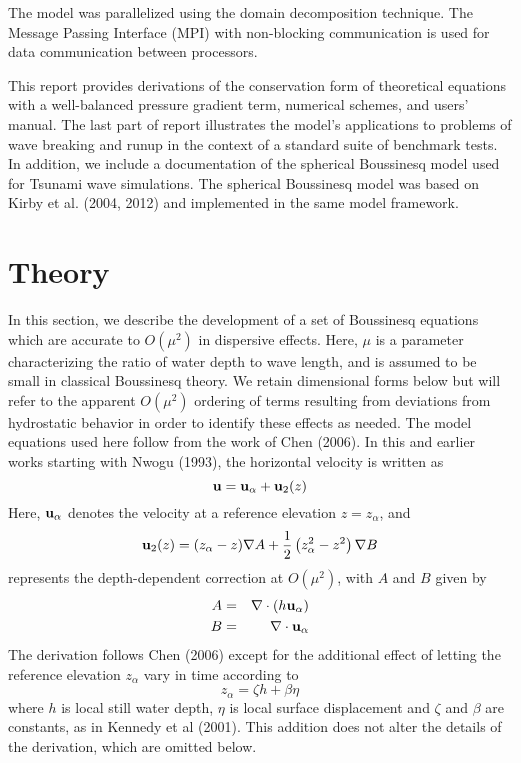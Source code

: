 \documentclass[11pt]{article}
\newcommand{\be}{\begin{equation}}
\newcommand{\ee}{\end{equation}}
\newcommand{\ba}{\begin{eqnarray}}
\newcommand{\ea}{\end{eqnarray}}
\begin{document}
The model was parallelized using the domain decomposition technique. The Message Passing Interface (MPI) with non-blocking communication is used for data communication between processors. 


This report  provides derivations of the conservation form of theoretical equations with a well-balanced pressure gradient term, numerical schemes, and users' manual. The last part of report  illustrates the model's applications to  problems of wave breaking and runup  in the context of a standard suite of benchmark tests. 
In addition, we include a documentation of the spherical Boussinesq model used for Tsunami wave simulations.  The spherical Boussinesq model was based on Kirby et al. (2004, 2012) and implemented in the same model framework. 

\section{Theory}


In this section, we describe the development of a set of Boussinesq equations which are accurate to $O(\mu^2)$ in dispersive effects.  Here,  $\mu$ is a parameter characterizing the ratio of water depth to wave length, and is assumed to be small in classical Boussinesq theory.  We retain dimensional forms below but will refer to the apparent $O(\mu^2)$ ordering of terms resulting from deviations from hydrostatic behavior in order to identify these effects as needed.  The model equations used here follow from the work of Chen (2006).  In this and earlier works starting with Nwogu (1993), the horizontal velocity is written as
\be
{\bf u} = {\bf u}_\alpha + {\bf u}_2(z)   \label{eq1}
\ee
Here, ${\bf u}_\alpha$ denotes the velocity at a reference elevation $z=z_\alpha$, and
\be
{\bf u}_2 (z) = (z_\alpha - z) \nabla A + \frac{1}{2} \left( z_\alpha^2 - z^2 \right) \nabla B \label{eq2}
\ee
represents the depth-dependent correction at $O(\mu^2)$, with $A$ and $B$ given by
\ba
A &=& \nabla \cdot (h {\bf u}_\alpha)  \nonumber \\
B &=& \nabla \cdot {\bf u}_\alpha    \label{eq3}
\ea
The derivation follows Chen (2006) except for the additional effect of letting the reference elevation $z_\alpha$ vary in time according to
\be
z_{\alpha} =  \zeta h + \beta \eta \label{eq4}
\ee
where $h$ is local still water depth,  $\eta$ is local surface displacement and $\zeta$ and $\beta$ are constants, as in Kennedy et al (2001).  This addition does not alter the details of the derivation, which are omitted below.
\end{document}

